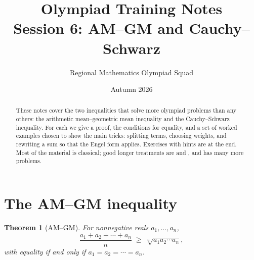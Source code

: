 \documentclass[11pt,a4paper]{article}
\title{Olympiad Training Notes\\[2pt] \large Session 6: AM--GM and Cauchy--Schwarz}
\author{Regional Mathematics Olympiad Squad}
\date{Autumn 2026}
\newtheorem{theorem}{Theorem}[section]
\theoremstyle{definition}
\theoremstyle{remark}
\begin{document}
\maketitle

\begin{abstract}
These notes cover the two inequalities that solve more olympiad problems than any others: the arithmetic mean--geometric mean inequality and the Cauchy--Schwarz inequality. For each we give a proof, the conditions for equality, and a set of worked examples chosen to show the main tricks: splitting terms, choosing weights, and rewriting a sum so that the Engel form applies. Exercises with hints are at the end. Most of the material is classical; good longer treatments are \cite{steele2004} and \cite{hlp1952}, and \cite{engel1998} has many more problems.
\end{abstract}

\tableofcontents

\section{The AM--GM inequality}

\begin{theorem}[AM--GM]\label{thm:amgm}
For nonnegative reals $a_1, \dots, a_n$,
\begin{equation}\label{eq:amgm}
  \frac{a_1 + a_2 + \cdots + a_n}{n} \;\geq\; \sqrt[n]{a_1 a_2 \cdots a_n},
\end{equation}
with equality if and only if $a_1 = a_2 = \cdots = a_n$.
\end{theorem}
\end{document}
